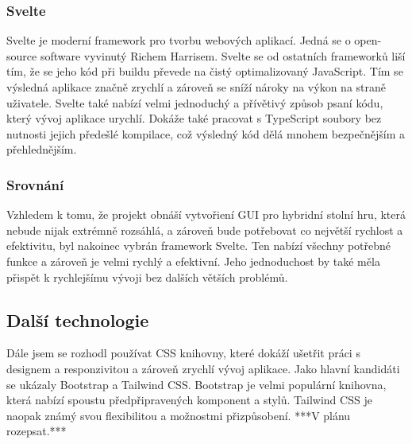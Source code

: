 \subsubsection{Svelte}
Svelte je moderní framework pro tvorbu webových aplikací. Jedná se o open-source software vyvinutý Richem Harrisem. Svelte se od ostatních frameworků liší tím, že se jeho kód při buildu převede na čistý optimalizovaný JavaScript. Tím se výsledná aplikace značně zrychlí a zároveň se sníží nároky na výkon na straně uživatele. Svelte také nabízí velmi jednoduchý a přívětivý způsob psaní kódu, který vývoj aplikace urychlí. Dokáže také pracovat s TypeScript soubory bez nutnosti jejich předešlé kompilace, což výsledný kód dělá mnohem bezpečnějším a přehlednějším.\cite{svelte_and_why_you_should_consider_it, svelte}

\subsubsection{Srovnání}
Vzhledem k tomu, že projekt obnáší vytvořiení GUI pro hybridní stolní hru, která nebude nijak extrémně rozsáhlá, a zároveň bude potřebovat co největší rychlost a efektivitu, byl nakoinec vybrán framework Svelte. Ten nabízí všechny potřebné funkce a zároveň je velmi rychlý a efektivní. Jeho jednoduchost by také měla přispět k rychlejšímu vývoji bez dalších větších problémů.

\subsection{Další technologie}
Dále jsem se rozhodl používat CSS knihovny, které dokáží ušetřit práci s designem a responzivitou a zároveň zrychlí vývoj aplikace. Jako hlavní kandidáti se ukázaly Bootstrap a Tailwind CSS. Bootstrap je velmi populární knihovna, která nabízí spoustu předpřipravených komponent a stylů. Tailwind CSS je naopak známý svou flexibilitou a možnostmi přizpůsobení.
***V plánu rozepsat.***